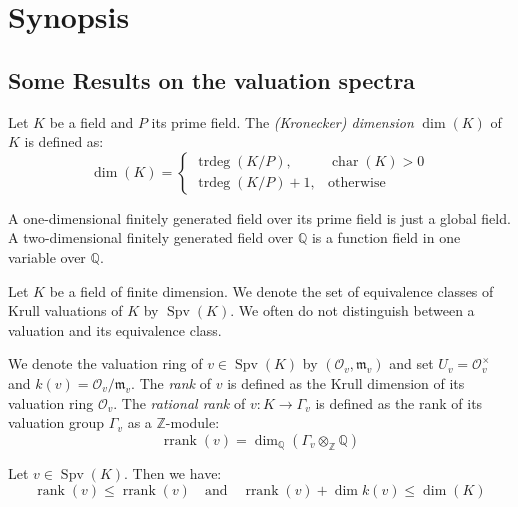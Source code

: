 \chapter{Synopsis}

\section{Some Results on the valuation spectra}

\begin{definition}
Let $K$ be a field and $P$ its prime field. The \textit{(Kronecker) dimension} $\dim(K)$ of $K$ is defined as:
\[\dim(K) = \begin{cases}
\operatorname{trdeg}(K/P), & \operatorname{char}(K)>0\\
\operatorname{trdeg}(K/P)+1, & \text{otherwise}
\end{cases} \]
\end{definition}

\begin{remark}
A one-dimensional finitely generated field over its prime field is just a global field. A two-dimensional finitely generated field over $\mathbb{Q}$ is a function field in one variable over $\mathbb{Q}$.
\end{remark}

\begin{definition}\label{2.1}
Let $K$ be a field of finite dimension. We denote the set of equivalence classes of Krull valuations of $K$ by $\operatorname{Spv}(K)$. We often do not distinguish between a valuation and its equivalence class. 

We denote the valuation ring of $v\in\operatorname{Spv}(K)$ by $(\mathcal{O}_v,\mathfrak{m}_v)$ and set $U_v=\mathcal{O}_v^\times$ and $k(v)=\mathcal{O}_v/\mathfrak{m}_v$. The \textit{rank} of $v$ is defined as the Krull dimension of its valuation ring $\mathcal{O}_v$. The \textit{rational rank} of $v:K\to\Gamma_v$ is defined as the rank of its valuation group $\Gamma_v$ as a $\mathbb{Z}$-module:
\[\operatorname{rrank}(v) = \dim_\mathbb{Q}(\Gamma_v\otimes_\mathbb{Z}\mathbb{Q}) \]
\end{definition}

\begin{lemma}\label{rank-dimension-inequality}
Let $v\in\operatorname{Spv}(K)$. Then we have:
\[\operatorname{rank}(v)\leq \operatorname{rrank}(v)\quad\text{and}\quad\operatorname{rrank}(v)+\dim k(v)\leq\dim(K) \]
\end{lemma}

